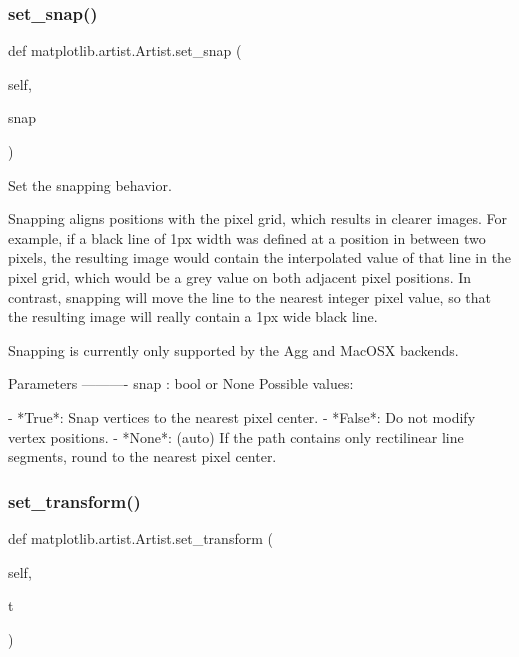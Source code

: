 \subsubsection{\texorpdfstring{set\+\_\+snap()}{set\_snap()}}
{\footnotesize\ttfamily def matplotlib.\+artist.\+Artist.\+set\+\_\+snap (\begin{DoxyParamCaption}\item[{}]{self,  }\item[{}]{snap }\end{DoxyParamCaption})}

\begin{DoxyVerb}Set the snapping behavior.

Snapping aligns positions with the pixel grid, which results in
clearer images. For example, if a black line of 1px width was
defined at a position in between two pixels, the resulting image
would contain the interpolated value of that line in the pixel grid,
which would be a grey value on both adjacent pixel positions. In
contrast, snapping will move the line to the nearest integer pixel
value, so that the resulting image will really contain a 1px wide
black line.

Snapping is currently only supported by the Agg and MacOSX backends.

Parameters
----------
snap : bool or None
    Possible values:

    - *True*: Snap vertices to the nearest pixel center.
    - *False*: Do not modify vertex positions.
    - *None*: (auto) If the path contains only rectilinear line
      segments, round to the nearest pixel center.
\end{DoxyVerb}
 \mbox{\label{classmatplotlib_1_1artist_1_1Artist_aec2c42392658168f02e7c646583e6cb8}} 
\subsubsection{\texorpdfstring{set\+\_\+transform()}{set\_transform()}}
{\footnotesize\ttfamily def matplotlib.\+artist.\+Artist.\+set\+\_\+transform (\begin{DoxyParamCaption}\item[{}]{self,  }\item[{}]{t }\end{DoxyParamCaption})}

